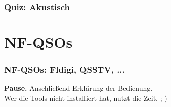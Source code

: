 \begin{frame}
  \frametitle{Quiz: Akustisch}

\end{frame}

\section[]{NF-QSOs}

\begin{frame}
  \frametitle{NF-QSOs: Fldigi, QSSTV, ...}

  \Large \textbf{Pause.}
  \normalsize Anschließend Erklärung der Bedienung. \\[2em]


  Wer die Tools nicht installiert hat, nutzt die Zeit. ;-)


\end{frame}

